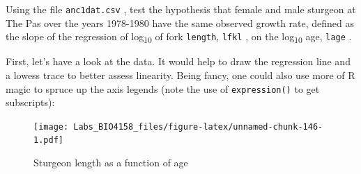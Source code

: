 \documentclass[
  12pt,
]{book}
\makeatletter
\newenvironment{Shaded}{\begin{snugshade}}{\end{snugshade}}
\newcommand{\DataTypeTok}[1]{\textcolor[rgb]{0.13,0.29,0.53}{#1}}
\newcommand{\DecValTok}[1]{\textcolor[rgb]{0.00,0.00,0.81}{#1}}
\newcommand{\KeywordTok}[1]{\textcolor[rgb]{0.13,0.29,0.53}{\textbf{#1}}}
\newcommand{\NormalTok}[1]{#1}
\newcommand{\OperatorTok}[1]{\textcolor[rgb]{0.81,0.36,0.00}{\textbf{#1}}}
\newcommand{\OtherTok}[1]{\textcolor[rgb]{0.56,0.35,0.01}{#1}}
\newcommand{\StringTok}[1]{\textcolor[rgb]{0.31,0.60,0.02}{#1}}
\newenvironment{kframe}{%
\medskip{}
\setlength{\fboxsep}{.8em}
\def\at@end@of@kframe{}%
\ifinner\ifhmode%
 \def\at@end@of@kframe{\end{minipage}}%
 \begin{minipage}{\columnwidth}%
\fi\fi%
\def\FrameCommand##1{\hskip\@totalleftmargin \hskip-\fboxsep
\colorbox{incolor}{##1}\hskip-\fboxsep
    \hskip-\linewidth \hskip-\@totalleftmargin \hskip\columnwidth}%
\MakeFramed {\advance\hsize-\width
  \@totalleftmargin\z@ \linewidth\hsize
  \@setminipage}}%
{\par\unskip\endMakeFramed%
\at@end@of@kframe}
\newenvironment{rmdblock}[1]
 {
 \begin{itemize}
 \renewcommand{\labelitemi}{
   \raisebox{-.7\height}[0pt][0pt]{
     {\setkeys{Gin}{width=3em,keepaspectratio}\texttt{[image: images/\#1]}}
   }
 }
 \begin{kframe}
 \setlength{\fboxsep}{1em}
 \item
 }
 {
 \end{kframe}
 \end{itemize}
 }
\newenvironment{rmdcode}
  {\begin{rmdblock}{screen}}
  {\end{rmdblock}}
\makeatother
\begin{document}
\begin{rmdcode}
Using the file \texttt{anc1dat.csv} , test the hypothesis that female and male sturgeon at The Pas over the years 1978-1980 have the same observed growth rate, defined as the slope of the regression of log\textsubscript{10} of fork \texttt{length}, \texttt{lfkl} , on the log\textsubscript{10} age, \texttt{lage} .
\end{rmdcode}

First, let's have a look at the data. It would help to draw the regression line and a lowess trace to better assess linearity. Being fancy, one could also use more of R magic to spruce up the axis legends (note the use of \texttt{expression()} to get subscripts):

\begin{Shaded}
\end{Shaded}

\begin{figure}
\centering
\texttt{[image: Labs\_BIO4158\_files/figure-latex/unnamed-chunk-146-1.pdf]}
\caption{\label{fig:unnamed-chunk-146}Sturgeon length as a function of age}
\end{figure}
\end{document}
